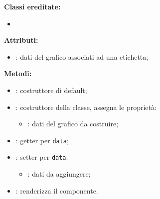 
\textbf{Classi ereditate:}
\begin{itemize}
	\item {}
\end{itemize}


\textbf{Attributi:}
\begin{itemize}
	\item {}: dati del grafico associati ad una etichetta;
\end{itemize}

\textbf{Metodi:}
\begin{itemize}
	\item {}: costruttore di default;
	\item {}: costruttore della classe, assegna le proprietà:
	\begin{itemize}
		\item {}: dati del grafico da costruire;
	\end{itemize}
	\item {}: getter per \texttt{data};
	\item {}: setter per \texttt{data}:
	\begin{itemize}
		\item {}: dati da aggiungere;
	\end{itemize}
	\item {}: renderizza il componente.
\end{itemize}

